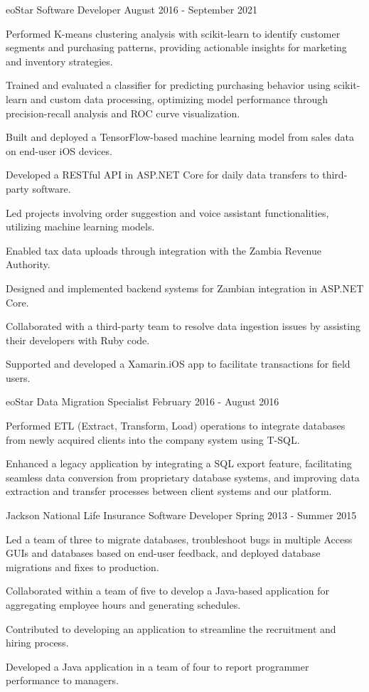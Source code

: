 \documentclass{../styles/cv}
\begin{document}
\subsectionpositiondate
    {eoStar}
    {Software Developer}
    {August 2016 - September 2021}
\resumesublistbegin
    \item Performed K-means clustering analysis with scikit-learn to identify customer segments and purchasing patterns, providing actionable insights for marketing and inventory strategies.
    \item Trained and evaluated a classifier for predicting purchasing behavior using scikit-learn and custom data processing, optimizing model performance through precision-recall analysis and ROC curve visualization.
    \item Built and deployed a TensorFlow-based machine learning model from sales data on end-user iOS devices.
    \item Developed a RESTful API in ASP.NET Core for daily data transfers to third-party software.
    \item Led projects involving order suggestion and voice assistant functionalities, utilizing machine learning models.
    \item Enabled tax data uploads through integration with the Zambia Revenue Authority.
    \item Designed and implemented backend systems for Zambian integration in ASP.NET Core.
    \item Collaborated with a third-party team to resolve data ingestion issues by assisting their developers with Ruby code.
    \item Supported and developed a Xamarin.iOS app to facilitate transactions for field users.
\resumesublistend

\subsectionpositiondate
    {eoStar}
    {Data Migration Specialist}
    {February 2016 - August 2016}
\resumesublistbegin
    \item Performed ETL (Extract, Transform, Load) operations to integrate databases from newly acquired clients into the company system using T-SQL.
    \item Enhanced a legacy \cpp application by integrating a SQL export feature, facilitating seamless data conversion from proprietary database systems, and improving data extraction and transfer processes between client systems and our platform.
\resumesublistend

\subsectionpositiondate
    {Jackson National Life Insurance}
    {Software Developer}
    {Spring 2013 - Summer 2015}
\resumesublistbegin
    \item Led a team of three to migrate databases, troubleshoot bugs in multiple Access GUIs and databases based on end-user feedback, and deployed database migrations and fixes to production.
    \item Collaborated within a team of five to develop a Java-based application for aggregating employee hours and generating schedules.
    \item Contributed to developing an application to streamline the recruitment and hiring process.
    \item Developed a Java application in a team of four to report programmer performance to managers.
\resumesublistend
\end{document}
